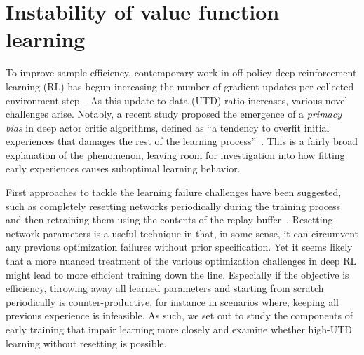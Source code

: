 \chapter{Instability of value function learning}
\label{chap:overestimation}

To improve sample efficiency, contemporary work in off-policy deep reinforcement learning (RL) has begun increasing the number of gradient updates per collected environment step~\parencite{janner2019mbpo,fedus2020revisiting,chen2021randomized, hiraoka2022dropout, nikishin2022primacy, doro2023barrier, schwarzer2023bigger, kim2023resetensemble}.  
As this update-to-data (UTD) ratio increases, various novel challenges arise.
Notably, a recent study proposed the emergence of a \emph{primacy bias} in deep actor critic algorithms, defined as ``a tendency to overfit initial experiences that damages the rest of the learning process''~\parencite{nikishin2022primacy}. 
This is a fairly broad explanation of the phenomenon, leaving room for investigation into how fitting early experiences causes suboptimal learning behavior.

First approaches to tackle the learning failure challenges have been suggested, such as completely resetting networks periodically during the training process and then retraining them using the contents of the replay buffer~\parencite{nikishin2022primacy, doro2023barrier}. 
Resetting network parameters is a useful technique in that, in some sense, it can circumvent any previous optimization failures without prior specification. 
Yet it seems likely that a more nuanced treatment of the various optimization challenges in deep RL might lead to more efficient training down the line. 
Especially if the objective is efficiency, throwing away all learned parameters and starting from scratch periodically is counter-productive, for instance in scenarios where, keeping all previous experience is infeasible. %
As such, we set out to study the components of early training that impair learning more closely and examine whether high-UTD learning without resetting is possible. 


